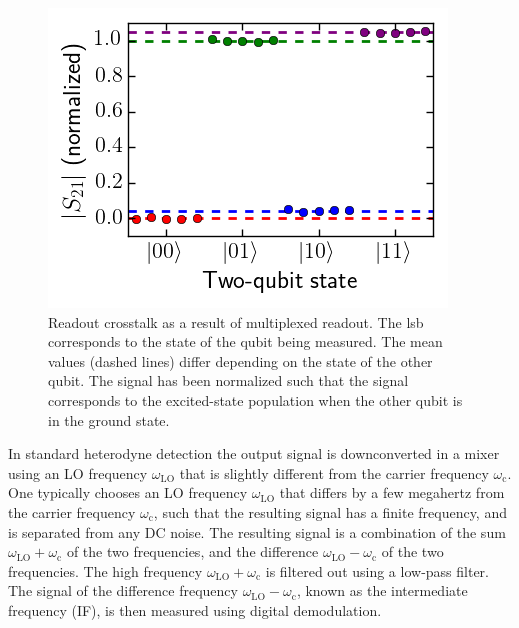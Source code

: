           \begin{figure}
            \begin{center}
            \vspace{-30pt}
              \includegraphics[width=\textwidth]{Figures/Calibration routines/crosstalk.png}
            \end{center}
            \vspace{-20 pt}
            \caption{Readout crosstalk as a result of multiplexed readout. The lsb corresponds to the state of the qubit being measured. The mean values (dashed lines) differ depending on the state of the other qubit. The signal has been normalized such that the signal corresponds to the excited-state population when the other qubit is in the ground state.}
            \label{fig:crosstalk}
          \end{figure}
          In standard heterodyne detection the output signal is downconverted in a mixer using an LO frequency $\omega_\text{LO}$ that is slightly different from the carrier frequency $\omega_\text{c}$. One typically chooses an LO frequency $\omega_\text{LO}$ that differs by a few megahertz from the carrier frequency $\omega_\text{c}$, such that the resulting signal has a finite frequency, and is separated from any DC noise. The resulting signal is a combination of the sum $\omega_\text{LO} + \omega_\text{c}$ of the two frequencies, and the difference $\omega_\text{LO} - \omega_\text{c}$ of the two frequencies. The high frequency $\omega_\text{LO} + \omega_\text{c}$ is filtered out using a low-pass filter. The signal of the difference frequency $\omega_\text{LO} - \omega_\text{c}$, known as the intermediate frequency (IF), is then measured using digital demodulation.


